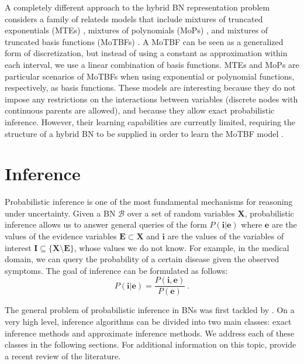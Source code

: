 A completely different approach to the hybrid BN representation problem considers a family of relateds models that include mixtures of truncated exponentials (MTEs) \citep{moral2001}, mixtures of polynomials (MoPs) \citep{shenoy2011}, and mixtures of truncated basis functions (MoTBFs) \citep{langseth2012}. A MoTBF can be seen as a generalized form of discretization, but instead of using a constant as approximation within each interval, we use a linear combination of basis functions. MTEs and MoPs are particular scenarios of MoTBFs when using exponential or polynomial functions, respectively, as basis functions. These models are interesting because they do not impose any restrictions on the interactions between variables (discrete nodes with continuous parents are allowed), and because they allow exact probabilistic inference. However, their learning capabilities are currently limited, requiring the structure of a hybrid BN to be supplied in order to learn the MoTBF model \citep{lopezcruz2013, lopezcruz2014, langseth2014}.

\section{Inference} \label{sec:2_inference}
Probabilistic inference is one of the most fundamental mechanisms for reasoning under uncertainty. Given a BN $\mathcal{B}$ over a set of random variables $\mathbf{X}$, probabilistic inference allows us to answer general queries of the form $P(\mathbf{i}|\mathbf{e})$ where $\mathbf{e}$ are the values of the evidence variables $\mathbf{E} \subset \mathbf{X}$ and $\mathbf{i}$ are the values of the variables of interest $\mathbf{I} \subseteq \{\mathbf{X} \setminus \mathbf{E}\}$, whose values we do not know. For example, in the medical domain, we can query the probability of a certain disease given the observed symptoms. The goal of inference can be formulated as follows:
\begin{equation*}
P(\mathbf{i}|\mathbf{e}) = \frac{P(\mathbf{i},\mathbf{e})}{P(\mathbf{e})} \ .
\end{equation*}

The general problem of probabilistic inference in BNs was first tackled by \cite{kim1983}. On a very high level, inference algorithms can be divided into two main classes: exact inference methods and approximate inference methods. We address each of these classes in the following sections. For additional information on this topic, \cite{salmeron2018} provide a recent review of the literature.
